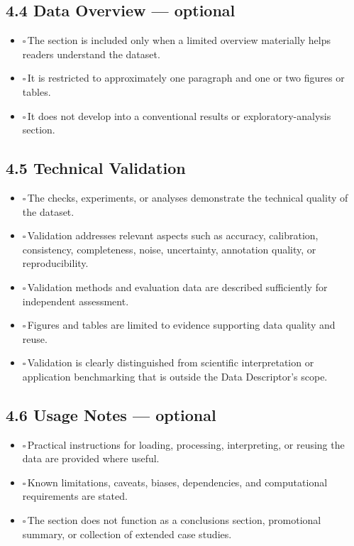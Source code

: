 \documentclass[11pt]{article}
\newcommand{\cbox}{$\square$\,}
\begin{document}
\subsection*{4.4 Data Overview --- optional}

\begin{itemize}
    \item \cbox The section is included only when a limited overview materially helps readers understand the dataset.
    \item \cbox It is restricted to approximately one paragraph and one or two figures or tables.
    \item \cbox It does not develop into a conventional results or exploratory-analysis section.
\end{itemize}

\subsection*{4.5 Technical Validation}

\begin{itemize}
    \item \cbox The checks, experiments, or analyses demonstrate the technical quality of the dataset.
    \item \cbox Validation addresses relevant aspects such as accuracy, calibration, consistency, completeness, noise, uncertainty, annotation quality, or reproducibility.
    \item \cbox Validation methods and evaluation data are described sufficiently for independent assessment.
    \item \cbox Figures and tables are limited to evidence supporting data quality and reuse.
    \item \cbox Validation is clearly distinguished from scientific interpretation or application benchmarking that is outside the Data Descriptor's scope.
\end{itemize}

\subsection*{4.6 Usage Notes --- optional}

\begin{itemize}
    \item \cbox Practical instructions for loading, processing, interpreting, or reusing the data are provided where useful.
    \item \cbox Known limitations, caveats, biases, dependencies, and computational requirements are stated.
    \item \cbox The section does not function as a conclusions section, promotional summary, or collection of extended case studies.
\end{itemize}
\end{document}
